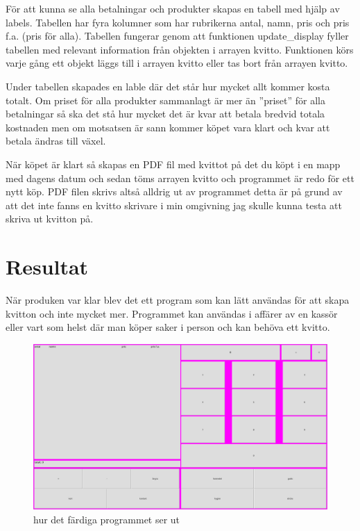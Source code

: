 \documentclass[a4paper, 12pt]{article}
\begin{document}
För att kunna se alla betalningar och produkter skapas en tabell med hjälp av labels. Tabellen har fyra kolumner som har rubrikerna antal, namn, pris och pris f.a. (pris för alla).
Tabellen fungerar genom att funktionen update\_display fyller tabellen med relevant information från objekten i arrayen kvitto. Funktionen körs varje gång ett objekt läggs till i arrayen kvitto eller tas bort från arrayen kvitto.


Under tabellen skapades en lable där det står hur mycket allt kommer kosta totalt. Om priset för alla produkter sammanlagt är mer än ''priset'' för alla betalningar så ska det stå hur mycket det är kvar att betala bredvid totala kostnaden men om motsatsen är sann kommer köpet vara klart och kvar att betala ändras till växel. 


När köpet är klart så skapas en PDF fil med kvittot på det du köpt i en mapp med dagens datum och sedan töms arrayen kvitto och programmet är redo för ett nytt köp.
PDF filen skrivs altså alldrig ut av programmet detta är på grund av att det inte fanns en kvitto skrivare i min omgivning jag skulle kunna testa att skriva ut kvitton på.

\section{Resultat}

När produken var klar blev det ett program som kan lätt användas för att skapa kvitton och inte mycket mer.
Programmet kan användas i affärer av en kassör eller vart som helst där man köper saker i person och kan behöva ett kvitto.

\begin{figure}[h!]
  \includegraphics[width=\linewidth]{img/ferdig.png}
  \caption{ hur det färdiga programmet ser ut}
  \label{fig:färdig}
\end{figure}
\end{document}
